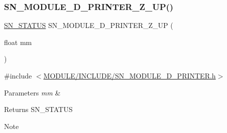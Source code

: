 \subsubsection{\texorpdfstring{S\+N\+\_\+\+M\+O\+D\+U\+L\+E\+\_\+D\+\_\+\+P\+R\+I\+N\+T\+E\+R\+\_\+\+Z\+\_\+\+U\+P()}{SN\_MODULE\_3D\_PRINTER\_Z\_UP()}}
{\footnotesize\ttfamily \hyperlink{group__SYSTEM__ERROR_ga4540713b9a7a18ce44d78c3a10f7442f}{S\+N\+\_\+\+S\+T\+A\+T\+US} S\+N\+\_\+\+M\+O\+D\+U\+L\+E\+\_\+D\+\_\+\+P\+R\+I\+N\+T\+E\+R\+\_\+\+Z\+\_\+\+UP (\begin{DoxyParamCaption}\item[{float}]{mm }\end{DoxyParamCaption})}



{\ttfamily \#include $<$\hyperlink{SN__MODULE__3D__PRINTER_8h}{M\+O\+D\+U\+L\+E/\+I\+N\+C\+L\+U\+D\+E/\+S\+N\+\_\+\+M\+O\+D\+U\+L\+E\+\_\+D\+\_\+\+P\+R\+I\+N\+T\+E\+R.\+h}$>$}


\begin{DoxyParams}{Parameters}
{\em mm} & \\
\hline
\end{DoxyParams}
\begin{DoxyReturn}{Returns}
S\+N\+\_\+\+S\+T\+A\+T\+US
\end{DoxyReturn}
\begin{DoxyNote}{Note}

\end{DoxyNote}
